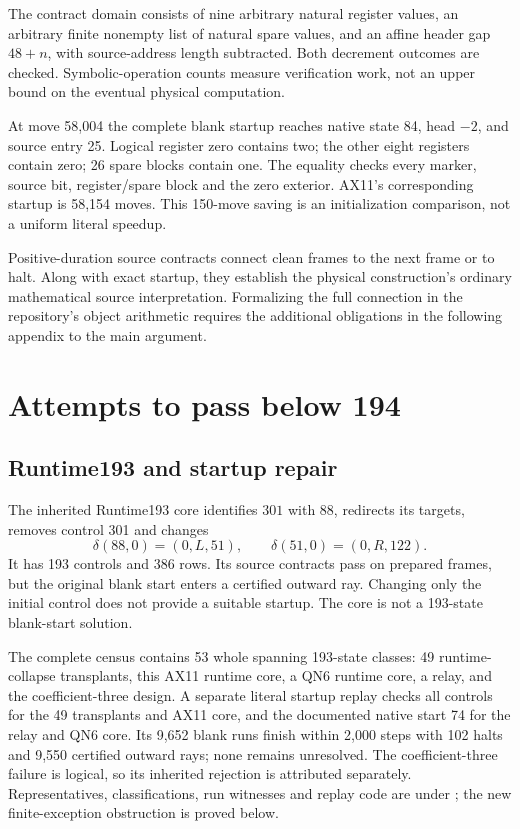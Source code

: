 \documentclass[11pt,letterpaper]{article}
\begin{document}
The contract domain consists of nine arbitrary natural register values,
an arbitrary finite nonempty list of natural spare values, and an affine
header gap $48+n$, with source-address length subtracted. Both decrement
outcomes are checked. Symbolic-operation counts measure verification
work, not an upper bound on the eventual physical computation.

At move 58,004 the complete blank startup reaches native state 84, head
$-2$, and source entry 25. Logical register zero contains two; the other
eight registers contain zero; 26 spare blocks contain one. The equality
checks every marker, source bit, register/spare block and the zero
exterior. AX11's corresponding startup is 58,154 moves. This 150-move
saving is an initialization comparison, not a uniform literal speedup.

Positive-duration source contracts connect clean frames to the next
frame or to halt. Along with exact startup, they establish the physical
construction's ordinary mathematical source interpretation. Formalizing
the full connection in the repository's object arithmetic requires the
additional obligations in the following appendix to the main argument.



\section{Attempts to pass below 194}
\subsection{Runtime193 and startup repair}
The inherited Runtime193 core identifies $301$ with $88$, redirects its
targets, removes control 301 and changes
\[
\delta(88,0)=(0,L,51),\qquad\delta(51,0)=(0,R,122).
\]
It has 193 controls and 386 rows. Its source contracts pass on prepared
frames, but the original blank start enters a certified outward ray.
Changing only the initial control does not provide a suitable startup.
The core is not a 193-state blank-start solution.

The complete census contains 53 whole spanning 193-state classes: 49
runtime-collapse transplants, this AX11 runtime core, a QN6 runtime core,
a relay, and the coefficient-three design. A separate literal startup
replay checks all controls for the 49 transplants and AX11 core, and the
documented native start 74 for the relay and QN6 core. Its 9,652 blank
runs finish within 2,000 steps with 102 halts and 9,550 certified outward
rays; none remains unresolved. The coefficient-three failure is logical,
so its inherited rejection is attributed separately. Representatives,
classifications, run witnesses and replay code are under
; the new finite-exception obstruction is proved below.
\end{document}
